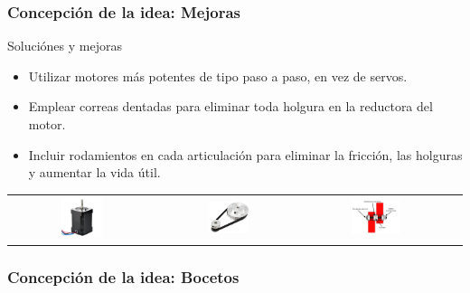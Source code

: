 \documentclass{beamer}
\begin{document}
\begin{frame}
  \frametitle{Concepción de la idea: Mejoras}
  
  \begin{block}{Soluciónes y mejoras}
    \begin{itemize}
    \item Utilizar motores más potentes de tipo paso a paso, en vez de servos.
    \item Emplear correas dentadas para eliminar toda holgura en la reductora del motor.
    \item Incluir rodamientos en cada articulación para eliminar la fricción, las holguras y aumentar la vida útil.
    \end{itemize}
  \end{block}
  \begin{tabular}{cccc}
    \includegraphics[width=0.3\textwidth, valign=m]{figs/nema1760.jpg} & \includegraphics[width=0.3\textwidth, valign=m]{figs/polea.png} 
    & \includegraphics[width=0.35\textwidth, valign=m]{figs/RodamientosBrida.png}
    
\end{tabular}
\end{frame}

\begin{frame}
  \frametitle{Concepción de la idea: Bocetos}

\end{frame}
\end{document}
